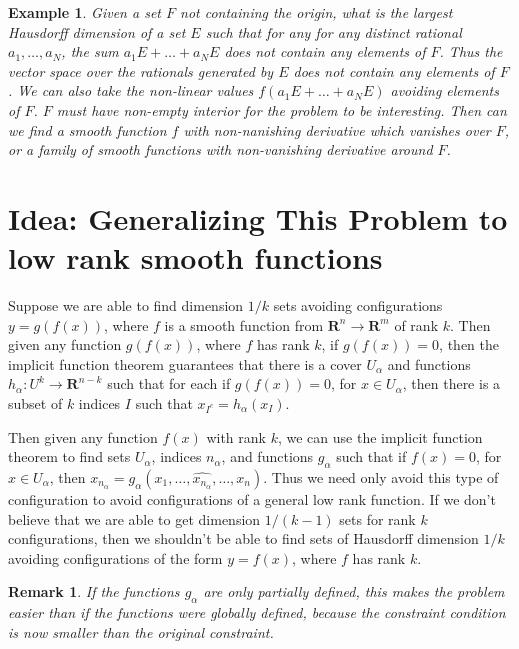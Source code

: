 \documentclass{report}
\theoremstyle{plain}
\newtheorem*{example}{Example}
\theoremstyle{plain}
\newtheorem*{remark}{Remark}
\begin{document}
\begin{example}
    Given a set $F$ not containing the origin, what is the largest Hausdorff dimension of a set $E$ such that for any for any distinct rational $a_1, \dots, a_N$, the sum $a_1E + \dots + a_NE$ does not contain any elements of $F$. Thus the vector space over the rationals generated by $E$ does not contain any elements of $F$. We can also take the non-linear values $f(a_1E + \dots + a_NE)$ avoiding elements of $F$. $F$ must have non-empty interior for the problem to be interesting. Then can we find a smooth function $f$ with non-nanishing derivative which vanishes over $F$, or a family of smooth functions with non-vanishing derivative around $F$.
\end{example}

\section{Idea: Generalizing This Problem to low rank smooth functions}

Suppose we are able to find dimension $1/k$ sets avoiding configurations $y = g(f(x))$, where $f$ is a smooth function from $\mathbf{R}^n \to \mathbf{R}^m$ of rank $k$. Then given any function $g(f(x))$, where $f$ has rank $k$, if $g(f(x)) = 0$, then the implicit function theorem guarantees that there is a cover $U_\alpha$ and functions $h_\alpha: U^k \to \mathbf{R}^{n-k}$ such that for each if $g(f(x)) = 0$, for $x \in U_\alpha$, then there is a subset of $k$ indices $I$ such that $x_{I^c} = h_\alpha(x_I)$.

Then given any function $f(x)$ with rank $k$, we can use the implicit function theorem to find sets $U_\alpha$, indices $n_\alpha$, and functions $g_\alpha$ such that if $f(x) = 0$, for $x \in U_\alpha$, then $x_{n_\alpha} = g_\alpha(x_1, \dots, \widehat{x_{n_\alpha}}, \dots, x_n)$. Thus we need only avoid this type of configuration to avoid configurations of a general low rank function. If we don't believe that we are able to get dimension $1/(k-1)$ sets for rank $k$ configurations, then we shouldn't be able to find sets of Hausdorff dimension $1/k$ avoiding configurations of the form $y = f(x)$, where $f$ has rank $k$. 

\begin{remark}
    If the functions $g_\alpha$ are only partially defined, this makes the problem easier than if the functions were globally defined, because the constraint condition is now smaller than the original constraint.
\end{remark}
\end{document}
